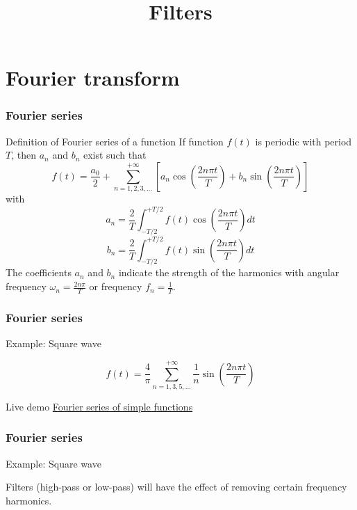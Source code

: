 \documentclass[beamer]{standalone}
\begin{document}
\title[Electronics 1]{Filters}

\begin{frame} 
  \titlepage
\end{frame}

\section{Fourier transform}
\begin{frame}
 \frametitle{Fourier series}
 \begin{block}{Definition of Fourier series of a function}
  If function $f(t)$ is \alert{periodic with period $T$}, then $a_n$ and $b_n$ exist such that
  \[ f(t) = \frac{a_0}{2} + \sum_{n=1,2,3,\ldots}^{+\infty} \left[ a_n \cos\left(\frac{2n\pi t}{T}\right) + b_n \sin\left(\frac{2n\pi t}{T}\right) \right] \]
  with
  \[ a_n = \frac{2}{T} \int_{-T/2}^{+T/2} f(t) \cos\left(\frac{2n\pi t}{T}\right) dt \]
  \[ b_n = \frac{2}{T} \int_{-T/2}^{+T/2} f(t) \sin\left(\frac{2n\pi t}{T}\right) dt \]
  The coefficients $a_n$ and $b_n$ indicate the strength of the harmonics with \alert{angular frequency $\omega_n = \frac{2n\pi}{T}$} or \alert{frequency $f_n = \frac{1}{T}$}.
 \end{block}
\end{frame}

\begin{frame}[t]
 \frametitle{Fourier series}
 \begin{block}{Example: Square wave}
  \begin{center}
  \end{center}
  \[ f(t) = \frac{4}{\pi} \sum_{n=1,3,5,\ldots}^{+\infty} \frac{1}{n} \sin\left(\frac{2n\pi t}{T}\right) \]
 \end{block}
 \begin{block}{Live demo}
  \href{http://demonstrations.wolfram.com/FourierSeriesOfSimpleFunctions}{Fourier series of simple functions}
 \end{block}
\end{frame}

\begin{frame}[t]
 \frametitle{Fourier series}
 \begin{block}{Example: Square wave}
  \begin{center}
  \end{center}
  Filters (high-pass or low-pass) will have the effect of removing certain frequency harmonics.
 \end{block}
\end{frame}
\end{document}
